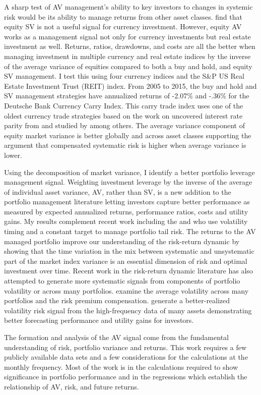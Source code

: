 A sharp test of AV management's ability to key investors to changes in systemic risk would be its ability to manage returns from other asset classes. \citet{moreira_volatility-managed_2017} find that equity SV is not a useful signal for currency investment. However, equity AV works as a management signal not only for currency investments but real estate investment as well. Returns, ratios, drawdowns, and costs are all the better when managing investment in multiple currency and real estate indices by the inverse of the average variance of equities compared to both a buy and hold, and equity SV management. I test this using four currency indices and the S\&P US Real Estate Investment Trust (REIT) index. From 2005 to 2015, the buy and hold and SV management strategies have annualized returns of -2.07\% and -.36\% for the Deutsche Bank Currency Carry Index. This carry trade index uses one of the oldest currency trade strategies based on the work on uncovered interest rate parity from \citet{noauthor_speculative_nodate,fama_forward_1984} and studied by \citet{lustig_cross_2007,brunnermeier_carry_nodate,burnside_carry_2011} among others. The average variance component of equity market variance is better globally and across asset classes supporting the argument that compensated systematic risk is higher when average variance is lower. 

Using the decomposition of market variance, I identify a better portfolio leverage management signal. Weighting investment leverage by the inverse of the average of individual asset variance, AV, rather than SV, is a new addition to the portfolio management literature letting investors capture
better performance as measured by expected annualized returns,  performance ratios, costs and utility gains. My results complement recent work including the \citet{moreira_volatility-managed_2017} and \citet{hocquard_constant-volatility_2013} who use volatility timing and a constant target to manage portfolio tail risk. The returns to the AV managed portfolio improve our understanding of the risk-return dynamic by showing that the time variation in the mix between systematic and unsystematic part of the market index variance is an essential dimension of risk and optimal investment over time.  Recent work in the risk-return dynamic literature has also attempted to generate more systematic signals from components of portfolio volatility or across many portfolios. \citet{gonzalez-urteaga_cross-sectional_2016} examine the average volatility across many portfolios and the risk premium compensation. \citet{bollerslev_risk_2017} generate a better-realized volatility risk signal from the high-frequency data of many assets demonstrating better forecasting performance and utility gains for investors. 

The formation and analysis of the AV signal come from the fundamental understanding of risk, portfolio variance and returns. This work requires a few publicly available data sets and a few considerations for the calculations at the monthly frequency. Most of the work is in the calculations required to show significance in portfolio performance and in the regressions which establish the relationship of AV, risk, and future returns.